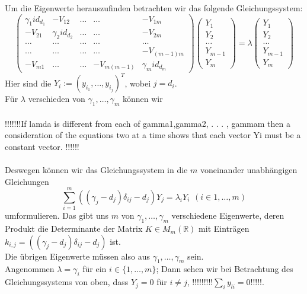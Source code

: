 Um die Eigenwerte herauszufinden betrachten wir das folgende Gleichungssystem:
\begin{equation}
\begin{pmatrix}
 {\gamma_1}id_{d_1}&-V_{12}&\ldots&\ldots&-V_{1m}\\
 -V_{21}&{\gamma_2}id_{d_2}&\ldots&\ldots&-V_{2m}\\
 \ldots&\ldots&\ldots&\ldots&\ldots\\
  \ldots&\ldots&\ldots&\ldots&-V_{(m-1)m}\\
 -V_{m1}&\ldots&\ldots&-V_{m(m-1)}&{\gamma_m}id_{d_m}
\end{pmatrix}
\begin{pmatrix}
 Y_1\\
 Y_2\\
 \ldots\\
 Y_{m-1}\\
 Y_m
\end{pmatrix}
 =\lambda
 \begin{pmatrix}
 Y_1\\
 Y_2\\
 \ldots\\
 Y_{m-1}\\
 Y_m
\end{pmatrix}
\end{equation}
Hier sind die $Y_i:=(y_{i_1},\ldots,y_{i_j})^T$, wobei $j=d_i$.\\
Für $\lambda$ verschieden von $\gamma_1,\ldots,\gamma_m$ können wir\\ \\
!!!!!!!If lamda is different from each of gamma1,gamma2, . . . , gammam then a consideration of the
equations two at a time shows that each vector Yi must be a constant vector.
!!!!!! \\ \\
Deswegen können wir das Gleichungssystem in die $m$ voneinander unabhängigen Gleichungen 
\begin{equation}
 \sum_{i=1}^m((\gamma_j-d_j)\delta_{ij}-d_j)Y_j=\lambda_iY_i
  \hspace{5pt}(i\in{1,\ldots,m})
\end{equation}
umformulieren.
Das gibt uns $m$  von $\gamma_1,\ldots,\gamma_m$ verschiedene Eigenwerte, deren Produkt die Determinante der Matrix $K \in M_m(\mathbb{R})$ mit Einträgen $k_{i,j}=((\gamma_j-d_j)\delta_{ij}-d_j)$ ist.\\
Die übrigen Eigenwerte müssen also aus $\gamma_1,\ldots,\gamma_m$ sein.\\
Angenommen $\lambda=\gamma_i$ für ein $i\in\{1,\ldots,m\}$; Dann sehen wir bei Betrachtung des Gleichungssystems von oben, dass $Y_j=0$ für $i\neq j$, !!!!!!!!!$\sum_iy_{li}=0$!!!!!.
